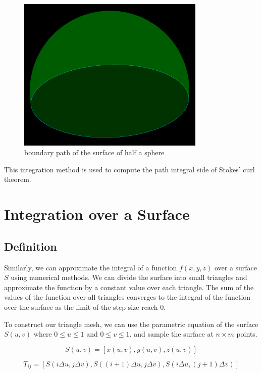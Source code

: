 \documentclass[12pt]{article}
\begin{document}
\begin{figure}[H]
    \centering
    \includegraphics[width=0.8\textwidth]{images/path.png}
    \caption{boundary path of the surface of half a sphere\cite{El-Deeb_PEU-218_Stokes_Threejs}}
\end{figure}

This integration method is used to compute the path integral side of Stokes' curl theorem.

\newpage
\section{Integration over a Surface}

\subsection{Definition}

Similarly, we can approximate the integral of a function \(f(x, y, z)\) over a surface \(S\) using numerical methods.
We can divide the surface into small triangles and approximate the function by a constant value over each triangle.
The sum of the values of the function over all triangles converges to the integral of the function over the surface
as the limit of the step size reach 0.

To construct our triangle mesh, we can use the parametric equation of the surface \(S(u, v)\) where \(0 \leq u \leq 1\) and \(0 \leq v \leq 1\).
and sample the surface at \(n \times m\) points.

\[
    S(u, v) = \left[x(u, v), y(u, v), z(u, v)\right]
\]

\[
    T_{ij} = \left[S\left(i \Delta u, j \Delta v\right), S\left((i + 1)\Delta u, j \Delta v\right), S\left(i \Delta u, (j + 1) \Delta v\right)\right]
\]
\end{document}
